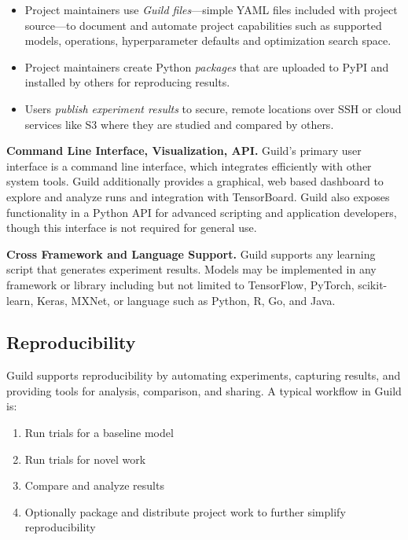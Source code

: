 \documentclass{article}
\begin{document}
\begin{itemize}[topsep=0pt, itemsep=0pt]
\item Project maintainers use \emph{Guild files}---simple YAML files
  included with project source---to document and automate project
  capabilities such as supported models, operations, hyperparameter
  defaults and optimization search space.

\item Project maintainers create Python \emph{packages} that are
  uploaded to PyPI and installed by others for reproducing results.

\item Users \emph{publish experiment results} to secure, remote
  locations over SSH or cloud services like S3 where they are studied
  and compared by others.
\end{itemize}

\textbf{Command Line Interface, Visualization, API.} Guild's primary
user interface is a command line interface, which integrates
efficiently with other system tools. Guild additionally provides a
graphical, web based dashboard to explore and analyze runs and
integration with TensorBoard. Guild also exposes functionality in a
Python API for advanced scripting and application developers, though
this interface is not required for general use.

\textbf{Cross Framework and Language Support.} Guild supports any
learning script that generates experiment results. Models may be
implemented in any framework or library including but not limited to
TensorFlow, PyTorch, scikit-learn, Keras, MXNet, or language such as
Python, R, Go, and Java.

\subsection{Reproducibility}

Guild supports reproducibility by automating experiments, capturing
results, and providing tools for analysis, comparison, and sharing. A
typical workflow in Guild is:

\begin{enumerate}[noitemsep, topsep=0pt, partopsep=0pt]
\item Run trials for a baseline model
\item Run trials for novel work
\item Compare and analyze results
\item Optionally package and distribute project work to further
  simplify reproducibility
\end{enumerate}
\end{document}
